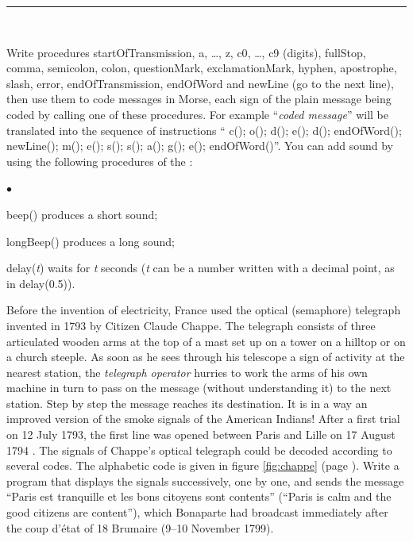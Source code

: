 \newpage
{}\noindent \rule{137mm}{0.1mm}\par\nopagebreak %
\begin{exercices}{\ \\
\vspace{-\baselineskip}

\sloppy
\tiret  Write procedures {\idt startOfTransmission}, {\idt a}, \ldots, {\idt z}, {\idt c0},
\ldots, {\idt c9} (digits), {\idt fullStop}, {\idt comma},
 {\idt semicolon}, {\idt colon}, {\idt questionMark},
 {\idt exclamationMark}, {\idt hyphen}, {\idt apostrophe},
  {\idt slash},
 {\idt error}, {\idt endOfTransmission}, {\idt endOfWord} and
 {\idt newLine} (go to the next line), then use them to code
 messages in Morse, each sign of the plain message being coded by calling one
 of these procedures. For example ``{\em coded message}'' will be translated into the sequence of instructions
`` {\ttfamily\idt c(); o(); d(); e(); d(); endOfWord(); newLine();
 m(); e(); s(); s(); a(); g(); e(); endOfWord()}''. You can add sound by using the following procedures
 of the \robot:
 \begin{list}{$\scriptscriptstyle\bullet$}{
}
   \item {\idt beep()} produces a short sound;
   \item {\idt longBeep()} produces a long sound;
   \item {\idt delay({\rm\em t})} waits for {\em t} seconds ({\em t} can be a number written with a decimal point, as in {\idt delay(0.5)}).
 \end{list}

 \tiret Before the invention of electricity, France used the optical (semaphore) telegraph invented in
 1793 by Citizen Claude Chappe. The telegraph consists of three articulated wooden arms
 at the top of a mast set up on a tower on a hilltop or on a church steeple.
 As soon as he sees through his telescope a sign of activity at the nearest station, the {\em telegraph operator}
 hurries to work the arms of his own machine in turn to pass on the message (without understanding it)
  to the next station. Step by step the message reaches its destination. It is in a
  way an improved version of the smoke signals of the American Indians! After a first
  trial on 12 July 1793, the first line was opened between Paris and Lille on 17 August 1794
  \cite{bertho}. The signals of Chappe's optical telegraph could be decoded
  according to several codes. The alphabetic code is given in figure \ref{fig:chappe} (page
  \pageref{fig:chappe}). Write a program that displays the signals successively, one by one,
  and sends the message ``Paris est tranquille et les bons citoyens sont contents''
  (``Paris is calm and the good citizens are content''),
  which Bonaparte had broadcast immediately after the coup d'état of 18 Brumaire (9--10 November
  1799).

}
\end{exercices}
